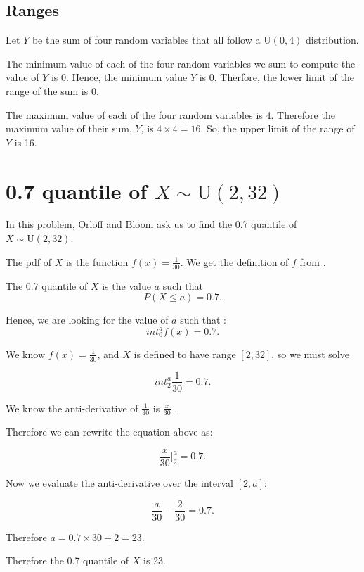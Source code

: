 \documentclass[a4paper,11pt]{article}
\begin{document}
\subsection{Ranges}

Let $Y$ be the sum of four random variables that all follow a 
$\text{U}\left( 0, 4 \right)$ distribution.

The minimum value of each of the four random variables we sum to
compute the value of $Y$ is 0.  Hence, the minimum value $Y$ is 0.
Therfore, the lower limit of the range of the sum is 0.

The maximum value of each of the four random variables is 4.
Therefore the maximum value of their sum, $Y$, is 
$4 \times 4 = 16$.  So, the upper limit of the range of $Y$
is 16.

\section{0.7 quantile of $X \sim \text{U}\left(2,32 \right)$}

In this problem, Orloff and Bloom ask us to find the
0.7 quantile of $X \sim \text{U}\left(2,32 \right)$.

The pdf of $X$ is the function $f\left( x \right) = \frac{1}{30}$.
We get the definition of $f$ from \cite{reading5c}.

The 0.7 quantile of $X$ is the value $a$ such that
\begin{equation}
P \left( X \leq a \right) = 0.7.
\end{equation}

Hence, we are looking for the value of $a$ such that \cite{reading6a}:
\begin{equation}
int_0^a f \left( x \right) = 0.7.
\end{equation}

We know $f \left( x \right) = \frac{1}{30}$, and $X$ is defined to
have range $\left[ 2, 32 \right]$, so we must solve

\begin{equation}
int_2^a \frac{1}{30} = 0.7.
\end{equation}

We know the anti-derivative of $\frac{1}{30}$ is $\frac{x}{30}$
\cite{basicInt}.

Therefore we can rewrite the equation above as:

\begin{equation}
\frac{x}{30} \bigg\rvert_2^a = 0.7.
\end{equation}

Now we evaluate the anti-derivative over the interval
$\left[2, a \right]$:

\begin{equation}
\frac{a}{30} -\frac{2}{30} = 0.7.
\end{equation}

Therefore $a = 0.7 \times 30 + 2 = 23$.

Therefore the 0.7 quantile of $X$ is 23.
\printbibliography{}
\end{document}
